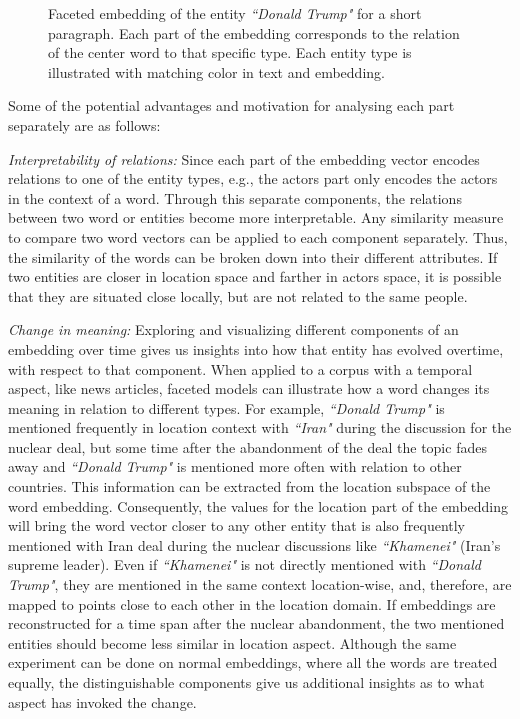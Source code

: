 \begin{figure}
\centering 
\resizebox{0.97\textwidth}{0.3\textwidth}{      

}
\caption{Faceted embedding of the entity \emph{``Donald Trump"} for a short paragraph. Each part of the embedding corresponds to the relation of the center word to that specific type. Each entity type is illustrated with matching color in text and embedding. }
\label{fig:faceted_emb}
\end{figure} 
Some of the potential advantages and motivation for analysing each part separately are as follows: 
\begin{compactitem}
\item \emph{Interpretability of relations:} Since each part of the embedding vector encodes relations to one of the entity types, e.g., the actors part only encodes the actors in the context of a word. Through this separate components, the relations between two word or entities become more interpretable. Any similarity measure to compare two word vectors can be applied to each component separately. Thus, the similarity of the words can be broken down into their different attributes. If two entities are closer in location space and farther in actors space, it is possible that they are situated close locally, but are not related to the same people. \\

\item \emph{Change in meaning:} Exploring and visualizing different components of an embedding over time gives us insights into how that entity has evolved overtime, with respect to that component. When applied to a corpus with a temporal aspect, like news articles, faceted models can illustrate how a word changes its meaning in relation to different types. For example, \emph{``Donald Trump"} is mentioned frequently in location context with \emph{``Iran"} during the discussion for the nuclear deal, but some time after the abandonment of the deal the topic fades away and \emph{``Donald Trump"}  is mentioned more often with relation to other countries. This information can be extracted from the location subspace of the word embedding. Consequently, the values for the location part of the embedding will bring the word vector closer to any other entity that is also frequently mentioned with Iran deal during the nuclear discussions like \emph{``Khamenei"} (Iran's supreme leader). Even if \emph{``Khamenei"} is not directly mentioned with \emph{``Donald Trump"}, they are mentioned in the same context location-wise, and, therefore, are mapped to points close to each other in the location domain. If embeddings are reconstructed for a time span after the nuclear abandonment, the two mentioned entities should become less similar in location aspect. Although the same experiment can be done on normal embeddings, where all the words are treated equally, the distinguishable components give us additional insights as to what aspect has invoked the change.\\


\end{compactitem}
